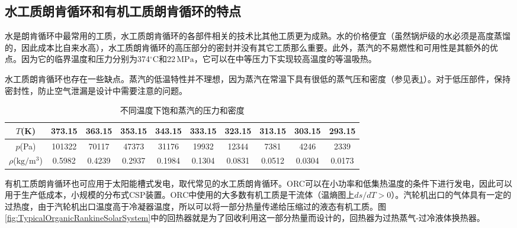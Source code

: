 \subsection{水工质朗肯循环和有机工质朗肯循环的特点}
\label{sec:RankineCycleFluid}

水是朗肯循环中最常用的工质，水工质朗肯循环的各部件相关的技术比其他工质更为成熟。水的价格便宜（虽然锅炉级的水必须是高度蒸馏的，因此成本比自来水高），水工质朗肯循环的高压部分的密封并没有其它工质那么重要。此外，蒸汽的不易燃性和可用性是其额外的优点。因为它的临界温度和压力分别为374$\mathrm{^\circ C}$和22$\,\mathrm{MPa}$，它可以在中等压力下实现较高温度的等温吸热。

水工质朗肯循环也存在一些缺点。蒸汽的低温特性并不理想，因为蒸汽在常温下具有很低的蒸气压和密度（参见表\ref{tab:waterT_P_D}）。对于低压部件，保持密封性，防止空气泄漏是设计中需要注意的问题。
\begin{table}[htbp]
\setlength{\abovecaptionskip}{0pt}
	\caption{不同温度下饱和蒸汽的压力和密度}
	\centering
	\begin{tabular}{cccccccccc}
		\toprule	
		    $T$(K)    &	373.15	    &    363.15    &    353.15    &    343.15    &    333.15    &    323.15    &    313.15    &    303.15    &    293.15\\
		\midrule	
		    $p$(Pa)    &    101322        &    70117    &    47373    &    31176    &    19932    &    12344    &    7381    &    4246    &    2339\\
		    $\rho$($\mathrm{kg/m^3}$)    &    0.5982        &    0.4239    &    0.2937    &    0.1984    &    0.1304    &    0.0831    &    0.0512    &    0.0304    &    0.0173\\
		\bottomrule
	\end{tabular}
	\label{tab:waterT_P_D}
\end{table}

有机工质朗肯循环也可应用于太阳能槽式发电，取代常见的水工质朗肯循环。ORC可以在小功率和低集热温度的条件下进行发电，因此可以用于生产低成本，小规模的分布式CSP装置。ORC中使用的大多数有机工质是干流体（温熵图上$ds/dT > 0$）。汽轮机出口的气体具有一定的过热度，由于汽轮机出口温度高于冷凝器温度，所以可以将一部分热量传递给压缩过的液态有机工质。图\ref{fig:TypicalOrganicRankineSolarSystem}中的回热器就是为了回收利用这一部分热量而设计的，回热器为过热蒸气-过冷液体换热器。

